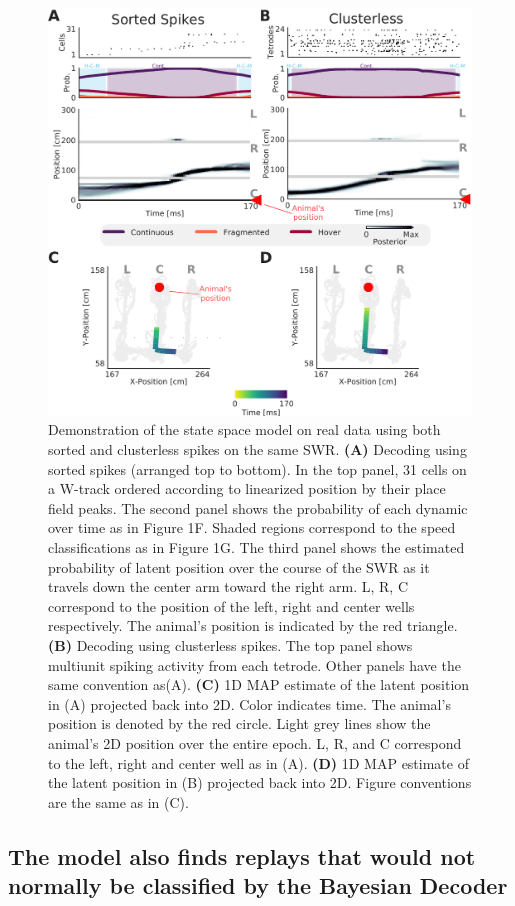 \documentclass[times, twoside]{zHenriquesLab-StyleBioRxiv}
\begin{document}
\begin{figure}%
\centering
\includegraphics[width=0.80\linewidth]{figures/Figure2/Figure2_v3}
\caption{Demonstration of the state space model on real data using both sorted and clusterless spikes on the same SWR. \textbf{(A)} Decoding using sorted spikes (arranged top to bottom). In the top panel, 31 cells on a W-track ordered according to linearized position by their place field peaks. The second panel shows the probability of each dynamic over time as in Figure 1F. Shaded regions correspond to the speed classifications as in Figure 1G. The third panel shows the estimated probability of latent position over the course of the SWR as it travels down the center arm toward the right arm. L, R, C correspond to the position of the left, right and center wells respectively. The animal's position is indicated by the red triangle. \textbf{(B)} Decoding using clusterless spikes. The top panel shows multiunit spiking activity from each tetrode. Other panels have the same convention as(A).  \textbf{(C)} 1D MAP estimate of the latent position in (A) projected back into 2D. Color indicates time. The animal's position is denoted by the red circle. Light grey lines show the animal's 2D position over the entire epoch. L, R, and C correspond to the left, right and center well as in (A). \textbf{(D)} 1D MAP estimate of the latent position in (B) projected back into 2D. Figure conventions are the same as in (C).
}
\label{Figure2}
\end{figure}

\subsection*{The model also finds replays that would not normally be classified by the Bayesian Decoder}
\end{document}
